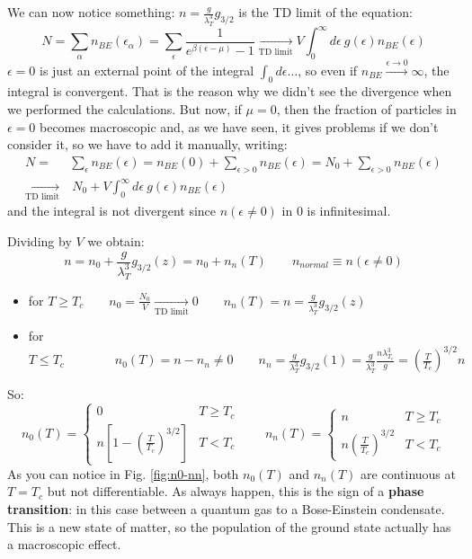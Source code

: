 We can now notice something: $n = \frac g{\lambda_T^3} g_{3/2}$ is the TD limit of the equation:
$$ N = \sum_\alpha n_{BE}(\epsilon_\alpha) = \sum_\epsilon \frac 1{e^{\beta(\epsilon-\mu)}-1} \xrightarrow[\text{TD limit}]{}V\int_0^{\infty} d\epsilon \ g(\epsilon) n_{BE}(\epsilon)$$
$\epsilon =0 $ is just an external point of the integral $\int_0 d\epsilon \dots$, so even if $n_{BE}\xrightarrow[]{\epsilon\to 0}\infty$, the integral is convergent. That is the reason why we didn't see the divergence when we performed the calculations. But now, if $\mu= 0$, then the fraction of particles in $\epsilon = 0$ becomes macroscopic and, as we have seen, it gives problems if we don't consider it, so we have to add it manually, writing:
\begin{align*} N = &\sum_\epsilon n_{BE} (\epsilon) = n_{BE}(0) + \sum_{\epsilon > 0}n_{BE}(\epsilon)  = N_0 + \sum_{\epsilon>0}n_{BE}(\epsilon)\\
\xrightarrow[\text{TD limit}]{} &\ N_0 + V\int_0^{\infty} d\epsilon \ g(\epsilon) n_{BE}(\epsilon) \end{align*}
and the integral is not divergent since $n(\epsilon\ne0)$ in 0 is infinitesimal.

Dividing by $V$ we obtain:
$$n = n_0 + \frac g{\lambda_T^3} g_{3/2}(z) = n_0 + n_n(T) \qquad n_{normal} \equiv n(\epsilon \ne 0)$$
\begin{itemize}
    \item for $T\ge T_c \qquad n_0 = \frac{N_0}V\xrightarrow[\text{TD limit}]{}0  \qquad n_n(T)= n = \frac g{\lambda_T^3} g_{3/2}(z)$ 
    \item for $T\le T_c \qquad \qquad n_0(T) = n-n_n \ne 0 \qquad n_n = \frac g{\lambda_T^3} g_{3/2}(1) = \frac g{\lambda_T^3}\frac{n\lambda_{T_c}^3}g = \left(\frac T{T_c}\right)^{3/2} n$ 
\end{itemize}

So:
$$
    n_0(T) = \begin{cases} 0 & T \ge T_c \\ n\left[1- \left(\frac T{T_c}\right)^{3/2}\right] & T < T_c \end{cases} \qquad 
    n_n(T) = \begin{cases} n & T \ge T_c \\ n\left(\frac T{T_c}\right)^{3/2} & T < T_c \end{cases}
$$
As you can notice in Fig. \ref{fig:n0-nn}, both $n_0(T)$ and $n_n(T)$ are continuous at $T=T_c$ but not differentiable. As always happen, this is the sign of a \textbf{phase transition}: in this case between a quantum gas to a Bose-Einstein condensate. This is a new state of matter, so the population of the ground state actually has a macroscopic effect.

